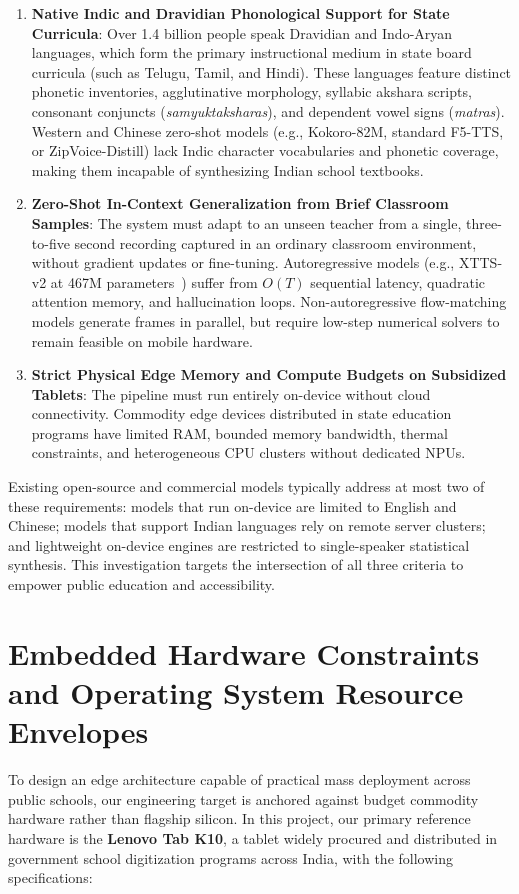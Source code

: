 \begin{enumerate}
    \item \textbf{Native Indic and Dravidian Phonological Support for State Curricula}: Over 1.4 billion people speak Dravidian and Indo-Aryan languages, which form the primary instructional medium in state board curricula (such as Telugu, Tamil, and Hindi). These languages feature distinct phonetic inventories, agglutinative morphology, syllabic akshara scripts, consonant conjuncts (\textit{samyuktaksharas}), and dependent vowel signs (\textit{matras}). Western and Chinese zero-shot models (e.g., Kokoro-82M, standard F5-TTS, or ZipVoice-Distill) lack Indic character vocabularies and phonetic coverage, making them incapable of synthesizing Indian school textbooks.
    
    \item \textbf{Zero-Shot In-Context Generalization from Brief Classroom Samples}: The system must adapt to an unseen teacher from a single, three-to-five second recording captured in an ordinary classroom environment, without gradient updates or fine-tuning. Autoregressive models (e.g., XTTS-v2 at 467M parameters~\cite{casanova2024xtts}) suffer from $O(T)$ sequential latency, quadratic attention memory, and hallucination loops. Non-autoregressive flow-matching models generate frames in parallel, but require low-step numerical solvers to remain feasible on mobile hardware.
    
    \item \textbf{Strict Physical Edge Memory and Compute Budgets on Subsidized Tablets}: The pipeline must run entirely on-device without cloud connectivity. Commodity edge devices distributed in state education programs have limited RAM, bounded memory bandwidth, thermal constraints, and heterogeneous CPU clusters without dedicated NPUs.
\end{enumerate}

Existing open-source and commercial models typically address at most two of these requirements: models that run on-device are limited to English and Chinese; models that support Indian languages rely on remote server clusters; and lightweight on-device engines are restricted to single-speaker statistical synthesis. This investigation targets the intersection of all three criteria to empower public education and accessibility.

\section{Embedded Hardware Constraints and Operating System Resource Envelopes}
To design an edge architecture capable of practical mass deployment across public schools, our engineering target is anchored against budget commodity hardware rather than flagship silicon. In this project, our primary reference hardware is the \textbf{Lenovo Tab K10}, a tablet widely procured and distributed in government school digitization programs across India, with the following specifications:

